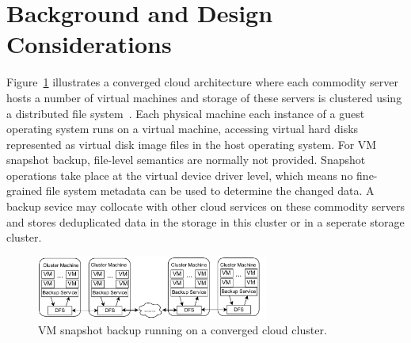 \section{Background and Design Considerations}
\label{sect:background}

Figure~\ref{fig:collocated} illustrates a converged cloud architecture where
each commodity server hosts a number of virtual machines and storage of these servers
is clustered using a distributed file system~\cite{googlefs03,hdfs10}.
Each physical machine 
each instance of a guest operating system runs on a virtual machine, accessing virtual hard disks 
represented as virtual disk image files in the host operating system.
For VM snapshot backup, file-level semantics are normally not provided.
Snapshot operations take place at the virtual device driver level, which
means no fine-grained file system metadata can be used to determine the changed data. 
A backup sevice may collocate with other cloud services on these commodity servers and 
stores deduplicated data  in  the storage in this cluster or in
a seperate storage cluster.





\begin{figure}[htb]
    \centering
    \includegraphics[width=3in]{images/colocated-arch}
    \caption{VM snapshot backup running on a converged cloud cluster.}
    \label{fig:collocated}
\end{figure}

